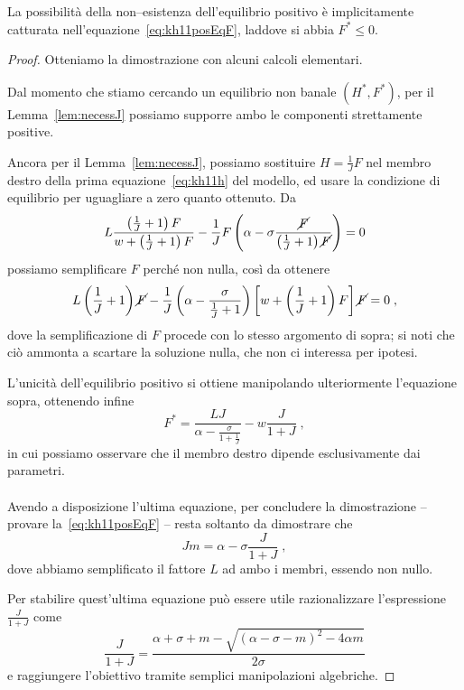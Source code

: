 La possibilità della non--esistenza dell'equilibrio positivo è implicitamente
catturata nell'equazione~\eqref{eq:kh11posEqF}, laddove si abbia $F^* \leq 0$.

\begin{proof}
    Otteniamo la dimostrazione con alcuni calcoli elementari.

    Dal momento che stiamo cercando un equilibrio non banale $(H^*, F^*)$, per il
    Lemma~\ref{lem:necessJ} possiamo supporre ambo le componenti strettamente positive.

    Ancora per il Lemma~\ref{lem:necessJ}, possiamo sostituire $H=\frac{1}{J} F$ nel membro destro della
    prima equazione~\eqref{eq:kh11h} del modello, ed usare la condizione di equilibrio per uguagliare
    a zero quanto ottenuto. Da
    $$L \frac{ \left( \frac{1}{J} +1 \right) F }{ w +\left( \frac{1}{J} +1 \right) F }
    - \frac{1}{J} F \left( \alpha - \sigma \frac{\cancel{F}}{ \left( \frac{1}{J} +1 \right) \cancel{F} } \right) = 0$$
    possiamo semplificare $F$ perché non nulla, così da ottenere
    $$L \left( \frac{1}{J} +1 \right) \cancel{F} - \frac{1}{J} \left( \alpha - \frac{\sigma}{ \frac{1}{J} +1 } \right)
    \left[ w + \left( \frac{1}{J} +1 \right) F \right] \cancel{F} = 0 \; ,$$
    dove la semplificazione di $F$ procede con lo stesso argomento di sopra; si noti che ciò ammonta a scartare la
    soluzione nulla, che non ci interessa per ipotesi.

    L'unicità dell'equilibrio positivo si ottiene manipolando ulteriormente l'equazione sopra, ottenendo infine
    $$F^* = \frac{LJ}{ \alpha - \frac{\sigma}{ 1 + \frac{1}{J} } } - w \frac{J}{1+J} \; ,$$
    in cui possiamo osservare che il membro destro dipende esclusivamente dai parametri.

    \paragraph{}
    Avendo a disposizione l'ultima equazione, per concludere la dimostrazione -- \ie provare la~\eqref{eq:kh11posEqF}
    -- resta soltanto da dimostrare che
    $$J m = \alpha - \sigma \frac{J}{1+J} \; ,$$
    dove abbiamo semplificato il fattore $L$ ad ambo i membri, essendo non nullo.

    Per stabilire quest'ultima equazione può essere utile razionalizzare l'espressione $\frac{J}{1+J}$ come
    $$\frac{J}{1+J} = \frac{ \alpha + \sigma + m - \sqrt{ {(\alpha - \sigma -m)}^2 - 4 \alpha m } }{2 \sigma}$$
    e raggiungere l'obiettivo tramite semplici manipolazioni algebriche.
\end{proof}

